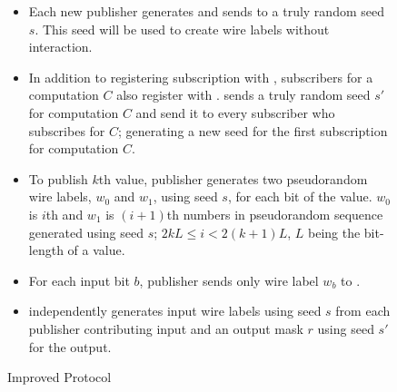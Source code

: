 \begin{figure}[h]
\begin{mdframed}[style=myframe]


\initialize
\begin{itemize}[leftmargin=*]
 
	\item Each new publisher generates and sends to \garbler a truly random seed
		$s$. This seed will be used to create wire labels without interaction.

\end{itemize}

\subscribe
\begin{itemize}[leftmargin=*]

	\item In addition to registering subscription with \broker, subscribers for a
		computation $C$ also register with \garbler. \garbler sends a truly
		random seed $s'$ for computation $C$ and send it to every subscriber who
		subscribes for $C$; generating a new seed for the first subscription for
		computation $C$.
		
\end{itemize}

\publish
\begin{itemize}[leftmargin=*]
		
	\item To publish $k$th value, publisher generates two pseudorandom wire
		labels, $w_0$ and $w_1$, using seed $s$, for each bit of the value.  $w_0$
		is $i$th and $w_1$ is $(i+1)$th numbers in pseudorandom sequence generated
		using seed $s$; $2kL \leq i < 2(k+1)L$, $L$ being the bit-length of a
		value.

	\item For each input bit $b$, publisher sends only wire label $w_b$ to
		\broker.

\end{itemize}

\process
\begin{itemize}[leftmargin=*]

	\item \garbler independently generates input wire labels using seed $s$ from
		each publisher contributing input and an output mask $r$ using seed $s'$
		for the output.

\end{itemize}

\end{mdframed}
\caption{Improved Protocol}
\label{fig:basicprotocol}
\end{figure}

